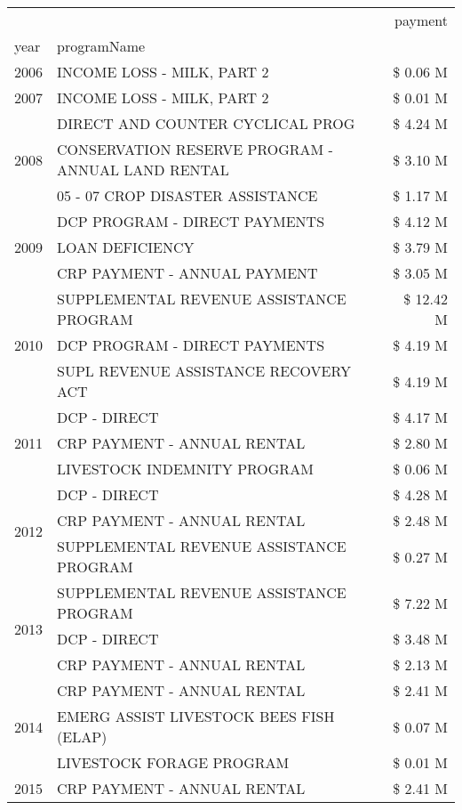 \begin{tabular}{llr}
\toprule
 &  & payment \\
year & programName &  \\
\midrule
2006 & INCOME LOSS - MILK, PART 2 & \$ 0.06 M \\
\cline{1-3}
2007 & INCOME LOSS - MILK, PART 2 & \$ 0.01 M \\
\cline{1-3}
\multirow[t]{3}{*}{2008} & DIRECT AND COUNTER CYCLICAL PROG & \$ 4.24 M \\
 & CONSERVATION RESERVE PROGRAM - ANNUAL LAND RENTAL & \$ 3.10 M \\
 & 05 - 07 CROP DISASTER ASSISTANCE & \$ 1.17 M \\
\cline{1-3}
\multirow[t]{3}{*}{2009} & DCP PROGRAM - DIRECT PAYMENTS & \$ 4.12 M \\
 & LOAN DEFICIENCY & \$ 3.79 M \\
 & CRP PAYMENT - ANNUAL PAYMENT & \$ 3.05 M \\
\cline{1-3}
\multirow[t]{3}{*}{2010} & SUPPLEMENTAL REVENUE ASSISTANCE PROGRAM & \$ 12.42 M \\
 & DCP PROGRAM - DIRECT PAYMENTS & \$ 4.19 M \\
 & SUPL REVENUE ASSISTANCE RECOVERY ACT & \$ 4.19 M \\
\cline{1-3}
\multirow[t]{3}{*}{2011} & DCP - DIRECT & \$ 4.17 M \\
 & CRP PAYMENT - ANNUAL RENTAL & \$ 2.80 M \\
 & LIVESTOCK INDEMNITY PROGRAM & \$ 0.06 M \\
\cline{1-3}
\multirow[t]{3}{*}{2012} & DCP - DIRECT & \$ 4.28 M \\
 & CRP PAYMENT - ANNUAL RENTAL & \$ 2.48 M \\
 & SUPPLEMENTAL REVENUE ASSISTANCE PROGRAM & \$ 0.27 M \\
\cline{1-3}
\multirow[t]{3}{*}{2013} & SUPPLEMENTAL REVENUE ASSISTANCE PROGRAM & \$ 7.22 M \\
 & DCP - DIRECT & \$ 3.48 M \\
 & CRP PAYMENT - ANNUAL RENTAL & \$ 2.13 M \\
\cline{1-3}
\multirow[t]{3}{*}{2014} & CRP PAYMENT - ANNUAL RENTAL & \$ 2.41 M \\
 & EMERG ASSIST LIVESTOCK BEES FISH (ELAP) & \$ 0.07 M \\
 & LIVESTOCK FORAGE PROGRAM & \$ 0.01 M \\
\cline{1-3}
\multirow[t]{3}{*}{2015} & CRP PAYMENT - ANNUAL RENTAL & \$ 2.41 M \\

\end{tabular}
